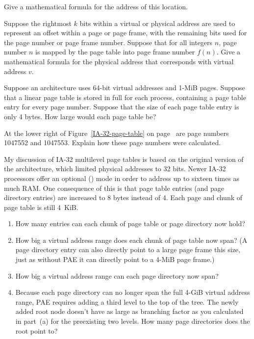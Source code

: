 \begin{chapterEnumerate}
Give a mathematical formula for the address of this location.
\item
Suppose the rightmost $k$ bits within a virtual or physical address
are used to represent an offset within a page or page frame, with the
remaining bits used for the page number or page frame number.  Suppose
that for all integers $n$, page number $n$ is mapped by the page table into page frame
number $f(n)$.  Give a mathematical formula for the physical address
that corresponds with virtual address $v$.
\item\label{linear-page-table-size-exercise}
Suppose an architecture uses 64-bit virtual addresses and 1-MiB pages.
Suppose that a linear page table is stored in full for each process,
containing a page table entry for every page number.  Suppose that the size
of each page table entry is only 4 bytes.  How large would each
page table be?
\item\label{IA-32-page-table-exercise}
At the lower right of Figure~\ref{IA-32-page-table} on page~\pageref{IA-32-page-table} are page numbers
1047552 and 1047553.  Explain how these page numbers were calculated.
\item\label{PAE-exercise}
My discussion of IA-32 multilevel page tables is based on the
original version of the architecture, which limited physical addresses
to 32 bits.  Newer IA-32 processors offer an optional  () mode in order to address up to sixteen times as
much RAM.  One consequence of this is that page table entries (and
page directory entries) are increased to 8 bytes instead of 4.
Each page and chunk of page table is still 4~KiB.
\begin{enumerate}
\item
How many entries can each chunk of page table or page directory now hold?
\item
How big a virtual address range does each chunk of page table now
span?  (A page directory entry can also directly point to a large
page frame this size, just as without PAE it can directly point to a
4-MiB page frame.)
\item
How big a virtual address range can each page directory now span?
\item
Because each page directory can no longer span the full 4-GiB
virtual address range, PAE requires adding a third level to the top of
the tree.  The newly added root node doesn't have as large as
branching factor as you calculated in part~(a)
for the preexisting two levels.  How many page directories does the
root point to?

\end{enumerate}
\end{chapterEnumerate}
